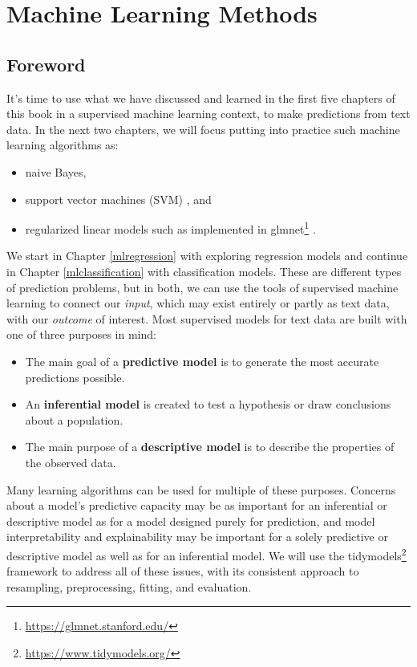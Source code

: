 \documentclass[
]{krantz}
\DeclareRobustCommand{\href}[2]{#2\footnote{\url{#1}}}
\renewcommand{\href}[2]{#2\footnote{\url{#1}}}
\begin{document}
\hypertarget{part-machine-learning-methods}{%
\part{Machine Learning Methods}\label{part-machine-learning-methods}}

\hypertarget{mlforeword}{%
\chapter*{Foreword}\label{mlforeword}}


\thispagestyle{myheadings}

It's time to use what we have discussed and learned in the first five chapters of this book in a supervised machine learning context, to make predictions from text data. In the next two chapters, we will focus putting into practice such machine learning algorithms as:

\begin{itemize}
\item
  naive Bayes,
\item
  support vector machines (SVM) \citep{Boser1992}, and
\item
  regularized linear models such as implemented in \href{https://glmnet.stanford.edu/}{glmnet} \citep{Friedman2010}.
\end{itemize}

We start in Chapter \ref{mlregression} with exploring regression models and continue in Chapter \ref{mlclassification} with classification models. These are different types of prediction problems, but in both, we can use the tools of supervised machine learning to connect our \emph{input}, which may exist entirely or partly as text data, with our \emph{outcome} of interest. Most supervised models for text data are built with one of three purposes in mind:

\begin{itemize}
\item
  The main goal of a \textbf{predictive model} is to generate the most accurate predictions possible.
\item
  An \textbf{inferential model} is created to test a hypothesis or draw conclusions about a population.
\item
  The main purpose of a \textbf{descriptive model} is to describe the properties of the observed data.
\end{itemize}

Many learning algorithms can be used for multiple of these purposes. Concerns about a model's predictive capacity may be as important for an inferential or descriptive model as for a model designed purely for prediction, and model interpretability and explainability may be important for a solely predictive or descriptive model as well as for an inferential model. We will use the \href{https://www.tidymodels.org/}{tidymodels} framework to address all of these issues, with its consistent approach to resampling, preprocessing, fitting, and evaluation.
\end{document}
